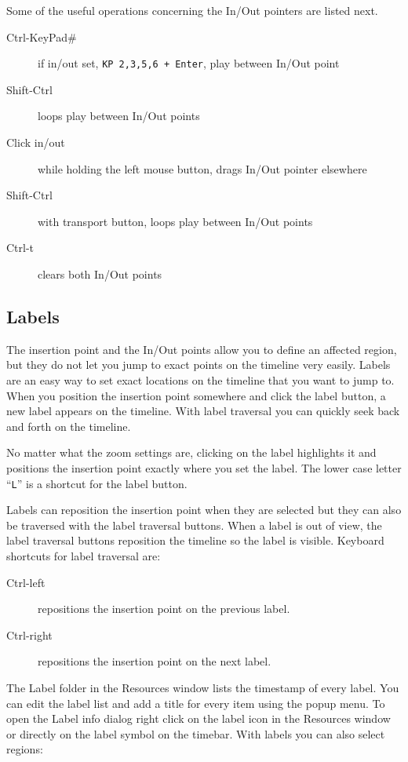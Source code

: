 Some of the useful operations concerning the In/Out pointers are listed next.

\begin{description}
    \item[Ctrl-KeyPad\#]  if in/out set, \texttt{KP 2,3,5,6 + Enter}, play between In/Out point
    \item[Shift-Ctrl]  loops play between In/Out points
    \item[Click in/out] while holding the left mouse button, drags In/Out pointer elsewhere
    \item[Shift-Ctrl] with transport button, loops play between In/Out points
    \item[Ctrl-t]  clears both In/Out points
\end{description}

\subsection{Labels}%
\label{sub:labels}

The insertion point and the In/Out points allow you to define an affected region, but they do not let you jump to exact points on the timeline very easily. 
Labels are an easy way to set exact locations on the timeline that you want to jump to. 
When you position the insertion point somewhere and click the label button, a new label appears on the timeline. 
With label traversal you can quickly seek back and forth on the timeline.

No matter what the zoom settings are, clicking on the label highlights it and positions the insertion point exactly where you set the label. 
The lower case letter “\texttt{L}” is a shortcut for the label button.

Labels can reposition the insertion point when they are selected but they can also be traversed with the label traversal buttons. When a label is out of view, the label traversal buttons reposition the timeline so the label is visible. Keyboard shortcuts for label traversal are:

\begin{description}
    \item[Ctrl-left] repositions the insertion point on the previous label.
    \item[Ctrl-right] repositions the insertion point on the next label.
\end{description}

The Label folder in the Resources window lists the timestamp of every label. 
You can edit the label list and add a title for every item using the popup menu. 
To open the Label info dialog right click on the label icon in the Resources window or directly on the label symbol on the timebar. 
With labels you can also select regions:


